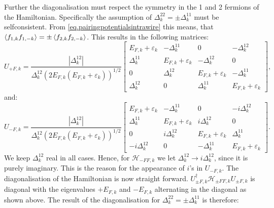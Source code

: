 Further the diagonalisation must respect the symmetry in the 1 and 2 fermions of the Hamiltonian. Specifically the assumption of $\Delta^{22}_k = \pm \Delta^{11}_k$ must be selfconsistent. From \ref{eq.pairingpotentialsintrawire} this means, that $\braket{f_{1,k}f_{1,-k}} = \pm\braket{f_{2,k}f_{2,-k}}$. This results in the following matrices:
\begin{equation}
U_{+F,k} = \frac{|\Delta^{12}_k|}{\Delta^{12}_k(2E_{F,k}(E_{F,k}+\varepsilon_k))^{1/2}}\begin{bmatrix} 
E_{F,k}+\varepsilon_k & -\Delta^{11}_k         & 0                      & -\Delta^{12}_k           \\  
\Delta^{11}_k         & E_{F,k}+\varepsilon_k  & -\Delta^{12}_k         & 0                        \\ 
0                     & \Delta^{12}_k          & E_{F,k}+\varepsilon_k  & -\Delta^{11}_k           \\ 
\Delta^{12}_k         & 0                      & \Delta^{11}_k          & E_{F,k}+\varepsilon_k
\end{bmatrix}, \nonumber
\end{equation}
and:
\begin{equation}
U_{-F,k} = \frac{|\Delta^{12}_k|}{\Delta^{12}_k(2E_{F,k}(E_{F,k}+\varepsilon_k))^{1/2}}\begin{bmatrix} 
E_{F,k}+\varepsilon_k & -\Delta^{11}_k         & 0                      & -i\Delta^{12}_k           \\  
\Delta^{11}_k         & E_{F,k}+\varepsilon_k  & i\Delta^{12}_k         & 0                        \\ 
0                     & i\Delta^{12}_k         & E_{F,k}+\varepsilon_k  & \Delta^{11}_k           \\ 
-i\Delta^{12}_k       & 0                      & -\Delta^{11}_k         & E_{F,k}+\varepsilon_k
\end{bmatrix}. \nonumber
\end{equation}
We keep $\Delta^{12}_k$ real in all cases. Hence, for $\mathcal{H}_{-FF,k}$ we let $\Delta^{12}_k \to i\Delta^{12}_k$, since it is purely imaginary. This is the reason for the appearance of $i$'s in $U_{-F,k}$. The diagonalisation of the Hamiltonian is now straight forward. $U^\dagger_{\pm F,k}\mathcal{H}_{\pm FF,k}U_{\pm F,k}$ is diagonal with the eigenvalues $+E_{F,k}$ and $-E_{F,k}$ alternating in the diagonal as shown above. The result of the diagonalisation for $\Delta^{22}_k = \pm \Delta^{11}_k$ is therefore:

